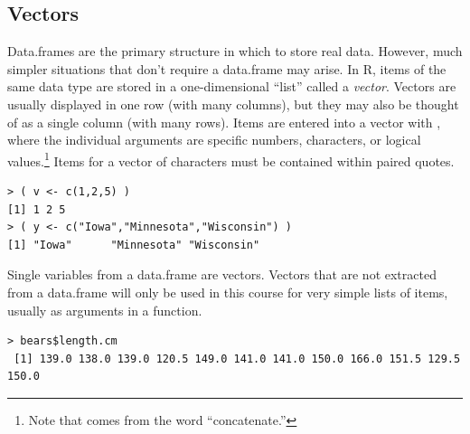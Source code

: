 \documentclass[10pt,openany]{book}\usepackage[]{graphicx}\usepackage[]{color}
\makeatletter
\newenvironment{kframe}{%
 \def\at@end@of@kframe{}%
 \ifinner\ifhmode%
  \def\at@end@of@kframe{\end{minipage}}%
  \begin{minipage}{\columnwidth}%
 \fi\fi%
 \def\FrameCommand##1{\hskip\@totalleftmargin \hskip-\fboxsep
 \colorbox{shadecolor}{##1}\hskip-\fboxsep
     \hskip-\linewidth \hskip-\@totalleftmargin \hskip\columnwidth}%
 \MakeFramed {\advance\hsize-\width
   \@totalleftmargin\z@ \linewidth\hsize
   \@setminipage}}%
 {\par\unskip\endMakeFramed%
 \at@end@of@kframe}
\newenvironment{knitrout}{}{} %
\makeatother
\begin{document}
\subsection{Vectors}  \label{sect:RVectors}
Data.frames are the primary structure in which to store real data.  However, much simpler situations that don't require a data.frame may arise.  In R, items of the same data type  are stored in a one-dimensional ``list'' called a \emph{vector}.  Vectors are usually displayed in one row (with many columns), but they may also be thought of as a single column (with many rows).  Items are entered into a vector with , where the individual arguments are specific numbers, characters, or logical values.\footnote{Note that  comes from the word ``concatenate.''}  Items for a vector of characters must be contained within paired quotes.
\begin{knitrout}
\color{fgcolor}\begin{kframe}
\begin{verbatim}
> ( v <- c(1,2,5) )
[1] 1 2 5
> ( y <- c("Iowa","Minnesota","Wisconsin") )
[1] "Iowa"      "Minnesota" "Wisconsin"
\end{verbatim}
\end{kframe}
\end{knitrout}


Single variables from a data.frame are vectors.  Vectors that are not extracted from a data.frame will only be used in this course for very simple lists of items, usually as arguments in a function.
\begin{knitrout}
\color{fgcolor}\begin{kframe}
\begin{verbatim}
> bears$length.cm
 [1] 139.0 138.0 139.0 120.5 149.0 141.0 141.0 150.0 166.0 151.5 129.5 150.0
\end{verbatim}
\end{kframe}
\end{knitrout}

\end{document}
